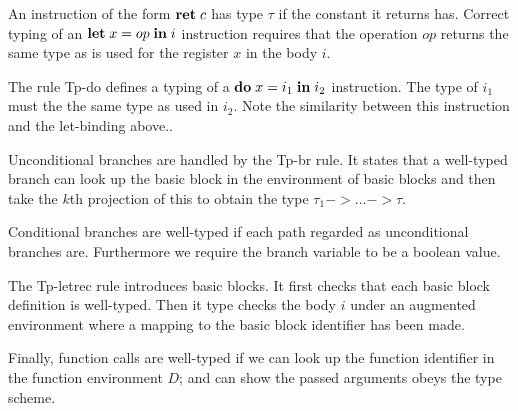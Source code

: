 \documentclass[a4paper, oneside, 10pt, draft]{memoir}
\begin{document}
An instruction of the form $\mathbf{ret} \; c$ has type $\tau$ if the constant
it returns has. Correct typing of an $\mathbf{let} \; x = op \; \mathbf{in} \; i$ instruction
requires that the operation $op$ returns the same type as is used for
the register $x$ in the body $i$.

The rule Tp-do defines a typing of a $\mathbf{do} \; x = i_1 \; \mathbf{in} \; i_2$
instruction. The type of $i_1$ must the the same type as used in
$i_2$. Note the similarity between this instruction and the
let-binding above..

Unconditional branches are handled by the Tp-br rule. It states that a
well-typed branch can look up the basic block in the environment of
basic blocks and then take the $k$th projection of this to obtain the
type $\tau_1 -> \dotsc -> \tau$.

Conditional branches are well-typed if each path regarded as
unconditional branches are. Furthermore we require the branch variable
to be a boolean value.

The Tp-letrec rule introduces basic blocks. It first checks that each
basic block definition is well-typed. Then it type checks the body $i$
under an augmented environment where a mapping to the basic block
identifier has been made.

Finally, function calls are well-typed if we can look up the function
identifier in the function environment $D$; and can show the
passed arguments obeys the type scheme.
\end{document}
